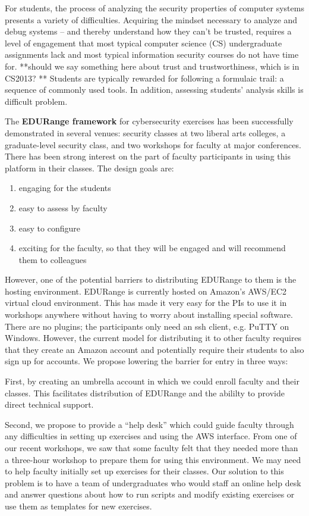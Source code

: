 For students, the process of analyzing the security
properties of computer systems presents a variety of difficulties.
Acquiring the mindset necessary to analyze and debug systems -- and
thereby understand how they can't be trusted, requires a level
of engagement that most typical computer science (CS) undergraduate assignments lack and
most typical information security courses do not have time for.  **should we say something
here about trust and trustworthiness, which is in CS2013? **
Students are typically rewarded for following a formulaic trail: a sequence
of commonly used tools.  In addition, assessing students' analysis skills is  difficult 
problem.


The {\bf EDURange framework} for cybersecurity exercises has been successfully demonstrated 
in several venues: security classes at two liberal arts colleges, a graduate-level security class, and
two workshops for faculty at major conferences.  There has been strong interest on the part of
faculty participants in using this platform in their classes.  The design goals are:
\begin{enumerate}
\item engaging for the students
\item easy to assess by faculty
\item easy to configure
\item exciting for the faculty, so that they will be engaged and will recommend them
  to colleagues
\end{enumerate}

However, one of the potential barriers to distributing EDURange to them is the hosting environment.
EDURange is currently hosted on
Amazon's AWS/EC2 virtual cloud environment.  This has made it very easy for the PIs to use it in 
workshops anywhere without having to worry about installing special software.  There are no plugins;
the participants only need an ssh client, e.g. PuTTY on Windows.  However, the current 
model for distributing
it to other faculty requires that they create an Amazon account and potentially require their students
to also sign up for accounts.  We propose lowering the barrier for entry in three ways:

First, by creating an umbrella account in 
which we could enroll faculty and their classes.  This facilitates distribution of EDURange
and the abililty to provide direct 
technical support.  

Second,
we propose to provide a ``help desk'' which could guide faculty through any difficulties in setting up 
exercises and using the AWS interface.  From one of our recent workshops, we saw that 
some faculty felt that they needed more than a three-hour workshop to prepare them for using this
environment.  We may need to help faculty initially set up exercises 
for their classes.  Our solution to this problem is  to have a team of undergraduates who would staff 
an online help desk
and answer questions about how to run scripts and modify existing exercises or use them as 
templates for new exercises.

